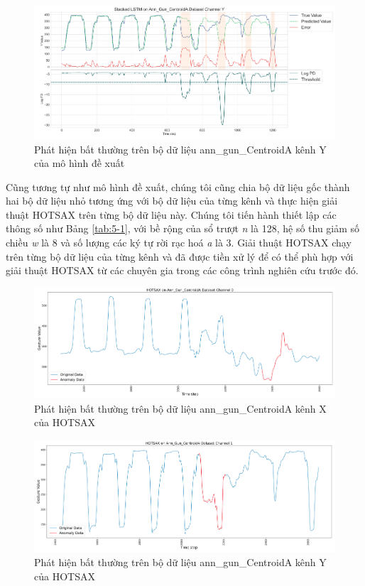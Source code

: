 \begin{figure}[H]
    \centering
    \includegraphics[scale=1]{./content/images/5-16.png}
    \caption{Phát hiện bất thường trên bộ dữ liệu ann\_gun\_CentroidA kênh Y của mô hình đề xuất}
    \label{fig:5-16}
\end{figure}

Cũng tương tự như mô hình đề xuất, chúng tôi cũng chia bộ dữ liệu gốc thành hai bộ dữ liệu nhỏ tương ứng với bộ dữ liệu của từng kênh và thực hiện giải thuật HOTSAX trên từng bộ dữ liệu này. Chúng tôi tiến hành thiết lập các thông số như Bảng \ref{tab:5-1}, với bề rộng của sổ trượt \textit{n} là 128, hệ số thu giảm số chiều \textit{w} là 8 và số lượng các ký tự rời rạc hoá \textit{a} là 3. Giải thuật HOTSAX chạy trên từng bộ dữ liệu của từng kênh và đã được tiền xử lý để có thể phù hợp với giải thuật HOTSAX từ các chuyên gia trong các công trình nghiên cứu trước đó.

\begin{figure}[H]
    \centering
    \includegraphics[scale=0.75]{./content/images/5-17.png}
    \caption{Phát hiện bất thường trên bộ dữ liệu ann\_gun\_CentroidA kênh X của HOTSAX}
    \label{fig:5-17}
\end{figure}

\begin{figure}[H]
    \centering
    \includegraphics[scale=0.75]{./content/images/5-18.png}
    \caption{Phát hiện bất thường trên bộ dữ liệu ann\_gun\_CentroidA kênh Y của HOTSAX}
    \label{fig:5-18}
\end{figure}

